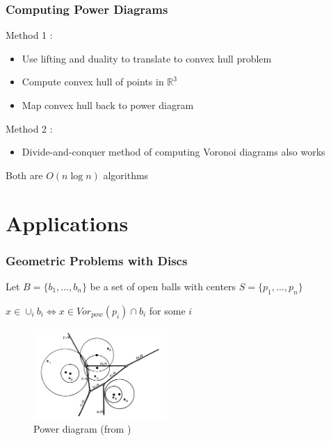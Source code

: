 \documentclass{beamer}
\newcommand{\R}{\mathbb{R}}
\begin{document}
\begin{frame}
  \frametitle{Computing Power Diagrams}

  Method 1 \cite{aurenhammer_power} :
  \begin{itemize}
    \item Use lifting and duality to translate to convex hull problem
    \item Compute convex hull of points in $\R^3$
    \item Map convex hull back to power diagram
  \end{itemize}

  Method 2 \cite{imai_power} :
  \begin{itemize}
    \item Divide-and-conquer method of computing Voronoi diagrams also works
  \end{itemize}

  \vspace{.5cm}

  Both are $O(n \log n)$ algorithms

\end{frame}

\section{Applications}

\begin{frame}
  \frametitle{Geometric Problems with Discs}

  Let $B = \{b_1, \ldots, b_n\}$ be a set of open balls with centers $S = \{p_1, \ldots, p_n\}$

  \begin{lemma}
    \hspace{1cm} $x \in \cup_i b_i \Leftrightarrow x \in Vor_{pow}(p_i) \cap b_i$ for some $i$ \cite{aurenhammer_discs}
  \end{lemma}

  \begin{figure}
    \includegraphics[width=2in]{power(aur_pow).png}
    \caption{Power diagram (from \cite{aurenhammer_power})}
  \end{figure}

\end{frame}
\end{document}
